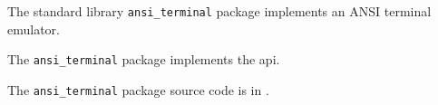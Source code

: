 
The standard library {\tt ansi\_terminal} package implements an ANSI terminal emulator.

The {\tt ansi\_terminal} package implements the  api.

The {\tt ansi\_terminal} package source code is in .



